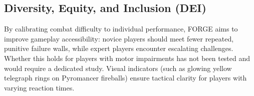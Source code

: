 \subsection*{Diversity, Equity, and Inclusion (DEI)}
By calibrating combat difficulty to individual performance, FORGE aims to improve gameplay accessibility: novice players should meet fewer repeated, punitive failure walls, while expert players encounter escalating challenges. Whether this holds for players with motor impairments has not been tested and would require a dedicated study. Visual indicators (such as glowing yellow telegraph rings on Pyromancer fireballs) ensure tactical clarity for players with varying reaction times.
